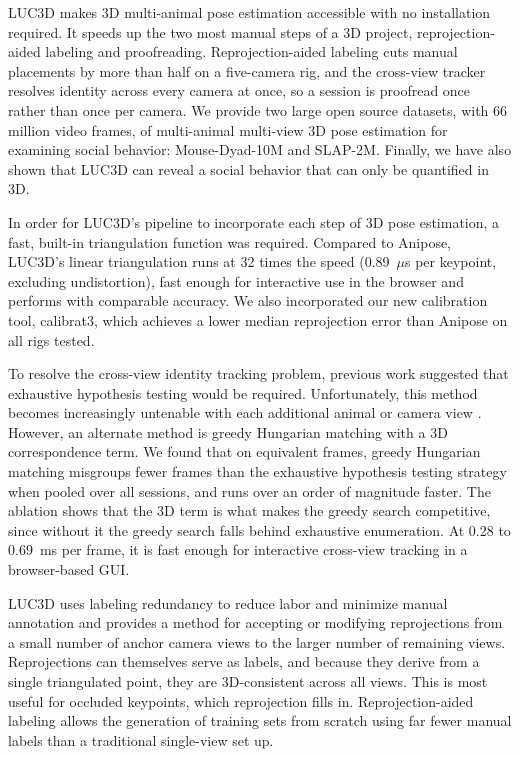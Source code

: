\documentclass[pdflatex, sn-nature]{sn-jnl}
\theoremstyle{thmstyleone}%
\theoremstyle{thmstyletwo}%
\theoremstyle{thmstylethree}%
\begin{document}
LUC3D makes 3D multi-animal pose estimation accessible with no installation required. It speeds up the two most manual steps of a 3D project, reprojection-aided labeling and proofreading. Reprojection-aided labeling cuts manual placements by more than half on a five-camera rig, and the cross-view tracker resolves identity across every camera at once, so a session is proofread once rather than once per camera. We provide two large open source datasets, with 66 million video frames, of multi-animal multi-view 3D pose estimation for examining social behavior: Mouse-Dyad-10M and SLAP-2M. Finally, we have also shown that LUC3D can reveal a social behavior that can only be quantified in 3D. 

In order for LUC3D's pipeline to incorporate each step of 3D pose estimation, a fast, built-in triangulation function was required. Compared to Anipose, LUC3D's linear triangulation runs at 32 times the speed (0.89~$\mu$s per keypoint, excluding undistortion), fast enough for interactive use in the browser and performs with comparable accuracy. We also incorporated our new calibration tool, calibrat3, which achieves a lower median reprojection error than Anipose on all rigs tested.

To resolve the cross-view identity tracking problem, previous work suggested that exhaustive hypothesis testing would be required. Unfortunately, this method becomes increasingly untenable with each additional animal or camera view \citep{Maree2024}. However, an alternate method is greedy Hungarian matching with a 3D correspondence term. We found that on equivalent frames, greedy Hungarian matching misgroups fewer frames than the exhaustive hypothesis testing strategy when pooled over all sessions, and runs over an order of magnitude faster. The ablation shows that the 3D term is what makes the greedy search competitive, since without it the greedy search falls behind exhaustive enumeration. At 0.28 to 0.69~ms per frame, it is fast enough for interactive cross-view tracking in a browser-based GUI.

LUC3D uses labeling redundancy to reduce labor and minimize manual annotation and provides a method for accepting or modifying reprojections from a small number of anchor camera views to the larger number of remaining views. Reprojections can themselves serve as labels, and because they derive from a single triangulated point, they are 3D-consistent across all views. This is most useful for occluded keypoints, which reprojection fills in. Reprojection-aided labeling allows the generation of training sets from scratch using far fewer manual labels than a traditional single-view set up. 
\end{document}
